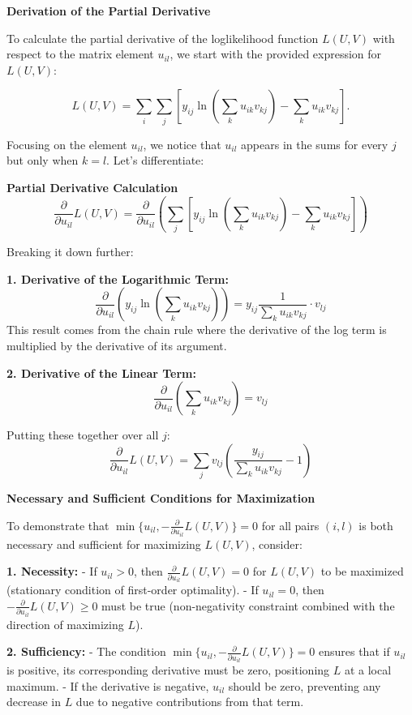 \documentclass[8pt]{article}
\begin{document}
\textbf{Derivation of the Partial Derivative}

To calculate the partial derivative of the loglikelihood function \(L(U, V)\) with respect to the matrix element \(u_{il}\), we start with the provided expression for \(L(U, V)\):

\[
L(U, V) = \sum_i \sum_j \left[ y_{ij} \ln \left( \sum_k u_{ik}v_{kj} \right) - \sum_k u_{ik}v_{kj} \right].
\]

Focusing on the element \(u_{il}\), we notice that \(u_{il}\) appears in the sums for every \(j\) but only when \(k = l\). Let's differentiate:

\textbf{Partial Derivative Calculation
}
\[
\frac{\partial}{\partial u_{il}} L(U, V) = \frac{\partial}{\partial u_{il}} \left( \sum_j \left[ y_{ij} \ln \left( \sum_k u_{ik}v_{kj} \right) - \sum_k u_{ik}v_{kj} \right] \right)
\]

Breaking it down further:

\textbf{1. Derivative of the Logarithmic Term:}
   \[
   \frac{\partial}{\partial u_{il}} \left( y_{ij} \ln \left( \sum_k u_{ik}v_{kj} \right) \right) = y_{ij} \frac{1}{\sum_k u_{ik}v_{kj}} \cdot v_{lj}
   \]
   This result comes from the chain rule where the derivative of the log term is multiplied by the derivative of its argument.

\textbf{2. Derivative of the Linear Term:}
   \[
   \frac{\partial}{\partial u_{il}} \left( \sum_k u_{ik}v_{kj} \right) = v_{lj}
   \]

Putting these together over all \(j\):
\[
\frac{\partial}{\partial u_{il}} L(U, V) = \sum_j v_{lj} \left( \frac{y_{ij}}{\sum_k u_{ik}v_{kj}} - 1 \right)
\]

\textbf{Necessary and Sufficient Conditions for Maximization}

To demonstrate that \(\min\{u_{il}, - \frac{\partial}{\partial u_{il}} L(U, V)\} = 0\) for all pairs \((i, l)\) is both necessary and sufficient for maximizing \(L(U, V)\), consider:

\textbf{1. Necessity:}
   - If \(u_{il} > 0\), then \(\frac{\partial}{\partial u_{il}} L(U, V) = 0\) for \(L(U, V)\) to be maximized (stationary condition of first-order optimality).
   - If \(u_{il} = 0\), then \(-\frac{\partial}{\partial u_{il}} L(U, V) \geq 0\) must be true (non-negativity constraint combined with the direction of maximizing \(L\)).

\textbf{2. Sufficiency:}
   - The condition \(\min\{u_{il}, - \frac{\partial}{\partial u_{il}} L(U, V)\} = 0\) ensures that if \(u_{il}\) is positive, its corresponding derivative must be zero, positioning \(L\) at a local maximum.
   - If the derivative is negative, \(u_{il}\) should be zero, preventing any decrease in \(L\) due to negative contributions from that term.
\end{document}
